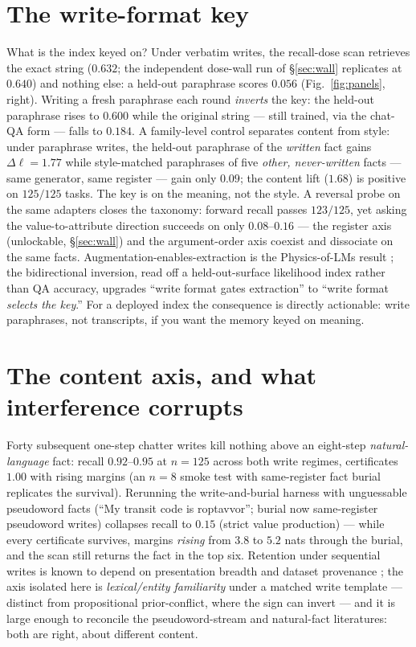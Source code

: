\documentclass{article}
\newcommand{\dlp}{\Delta\ell}
\begin{document}
\section{The write-format key}\label{sec:key}

What is the index keyed on? Under verbatim writes, the recall-dose scan retrieves the exact
string ($0.632$; the independent dose-wall run of \S\ref{sec:wall} replicates at
$0.640$) and nothing else: a held-out paraphrase scores $0.056$
(Fig.~\ref{fig:panels}, right). Writing a fresh
paraphrase each round \emph{inverts} the key: the held-out paraphrase rises to $0.600$
while the original string --- still trained, via the chat-QA form --- falls to $0.184$.
A family-level control separates content from style: under paraphrase writes, the held-out
paraphrase of the \emph{written} fact gains $\dlp = 1.77$ while style-matched paraphrases
of five \emph{other, never-written} facts --- same generator, same register --- gain only
$0.09$; the content lift ($1.68$) is positive on $125/125$ tasks. The key is on the
meaning, not the style. A reversal probe on the same adapters closes the taxonomy: forward
recall passes $123/125$, yet asking the value-to-attribute direction succeeds on only
$0.08$--$0.16$ --- the register axis (unlockable, \S\ref{sec:wall}) and the argument-order
axis \citep{berglund2024reversal} coexist and dissociate on the same facts. Augmentation-enables-extraction
is the Physics-of-LMs result \citep{allenzhu2024}; the bidirectional inversion, read off a
held-out-surface likelihood index rather than QA accuracy, upgrades ``write format gates
extraction'' to ``write format \emph{selects the key}.'' For a deployed index the
consequence is directly actionable: write paraphrases, not transcripts, if you want the
memory keyed on meaning.

\section{The content axis, and what interference corrupts}\label{sec:content}

Forty subsequent one-step chatter writes kill nothing above an eight-step
\emph{natural-language} fact: recall $0.92$--$0.95$ at $n{=}125$ across both write
regimes, certificates $1.00$ with rising margins (an $n{=}8$ smoke test with
same-register fact burial replicates the survival). Rerunning the write-and-burial harness with unguessable
pseudoword facts (``My transit code is roptavvor''; burial now same-register pseudoword
writes) collapses recall to $0.15$ (strict value production) --- while every certificate survives, margins \emph{rising} from $3.8$ to
$5.2$ nats through the burial, and the scan still returns the fact in the top six.
Retention under sequential writes is known to depend on presentation breadth
\citep{oneill2026continual} and dataset provenance \citep{chen2024remix}; the axis isolated
here is \emph{lexical/entity familiarity} under a matched write template ---
distinct from propositional prior-conflict, where the sign can invert
\citep{oneill2026continual} --- and it is large enough to reconcile the pseudoword-stream
and natural-fact literatures: both are right, about different content.
\end{document}
